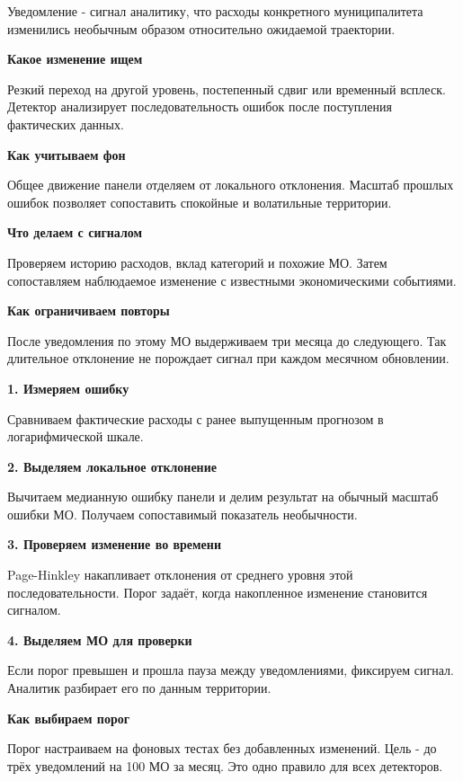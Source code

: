\documentclass[12pt,a4paper,landscape]{article}
\newcommand{\PageHead}[2]{{\fontsize{27}{32}\selectfont\bfseries #2\par}}
\newcommand{\Aside}[1]{\par{\fontsize{15}{19}\selectfont\bfseries\color{Green}#1\par}\vspace{2mm}}
\begin{document}
Уведомление - сигнал аналитику, что расходы конкретного муниципалитета изменились необычным образом относительно ожидаемой траектории.
\par\vspace{8mm}
\begin{minipage}[t]{.47\linewidth}\vspace{0pt}\RaggedRight
\Aside{Какое изменение ищем}
Резкий переход на другой уровень, постепенный сдвиг или временный всплеск. Детектор анализирует последовательность ошибок после поступления фактических данных.
\par\vspace{6mm}\Aside{Как учитываем фон}
Общее движение панели отделяем от локального отклонения. Масштаб прошлых ошибок позволяет сопоставить спокойные и волатильные территории.
\end{minipage}\hfill
\begin{minipage}[t]{.47\linewidth}\vspace{0pt}\RaggedRight
\Aside{Что делаем с сигналом}
Проверяем историю расходов, вклад категорий и похожие МО. Затем сопоставляем наблюдаемое изменение с известными экономическими событиями.
\par\vspace{6mm}\Aside{Как ограничиваем повторы}
После уведомления по этому МО выдерживаем три месяца до следующего. Так длительное отклонение не порождает сигнал при каждом месячном обновлении.
\end{minipage}


\clearpage\PageHead{Мониторинг}{От нового факта к уведомлению}\par\vspace{7mm}

\begin{minipage}[t]{.47\linewidth}\vspace{0pt}\RaggedRight
\Aside{1. Измеряем ошибку}
Сравниваем фактические расходы с ранее выпущенным прогнозом в логарифмической шкале.
\par\vspace{6mm}\Aside{2. Выделяем локальное отклонение}
Вычитаем медианную ошибку панели и делим результат на обычный масштаб ошибки МО. Получаем сопоставимый показатель необычности.
\end{minipage}\hfill
\begin{minipage}[t]{.47\linewidth}\vspace{0pt}\RaggedRight
\Aside{3. Проверяем изменение во времени}
Page-Hinkley накапливает отклонения от среднего уровня этой последовательности. Порог задаёт, когда накопленное изменение становится сигналом.
\par\vspace{6mm}\Aside{4. Выделяем МО для проверки}
Если порог превышен и прошла пауза между уведомлениями, фиксируем сигнал. Аналитик разбирает его по данным территории.
\end{minipage}
\par\vspace{8mm}\Aside{Как выбираем порог}
Порог настраиваем на фоновых тестах без добавленных изменений. Цель - до трёх уведомлений на 100 МО за месяц. Это одно правило для всех детекторов.
\end{document}
